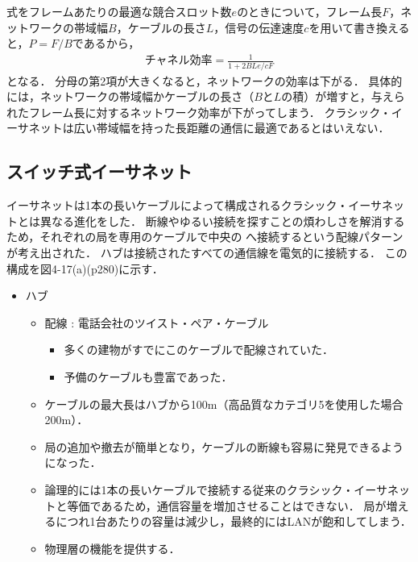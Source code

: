 \documentclass[a4paper]{ltjsarticle}
\begin{document}
式をフレームあたりの最適な競合スロット数\(e\)のときについて，フレーム長\(F\)，ネットワークの帯域幅\(B\)，ケーブルの長さ\(L\)，信号の伝達速度\(c\)を用いて書き換えると，\(P=F/B\)であるから，
\begin{align}
  \text{チャネル効率} = \frac{1}{1+2BLe/cF}
\end{align}
となる． 分母の第2項が大きくなると，ネットワークの効率は下がる．
具体的には，ネットワークの帯域幅かケーブルの長さ（\(B\)と\(L\)の積）が増すと，与えられたフレーム長に対するネットワーク効率が下がってしまう．
クラシック・イーサネットは広い帯域幅を持った長距離の通信に最適であるとはいえない．

\subsection{スイッチ式イーサネット}\label{ux30b9ux30a4ux30c3ux30c1ux5f0fux30a4ux30fcux30b5ux30cdux30c3ux30c8}

イーサネットは1本の長いケーブルによって構成されるクラシック・イーサネットとは異なる進化をした．
断線やゆるい接続を探すことの煩わしさを解消するため，それぞれの局を専用のケーブルで中央の
 へ接続するという配線パターンが考え出された．
ハブは接続されたすべての通信線を電気的に接続する．
この構成を図4-17(a)(p280)に示す．

\begin{itemize}
\item
  ハブ

  \begin{itemize}

  \item
    配線 : 電話会社のツイスト・ペア・ケーブル

    \begin{itemize}
  
    \item
      多くの建物がすでにこのケーブルで配線されていた．
    \item
      予備のケーブルも豊富であった．
    \end{itemize}
  \item
    ケーブルの最大長はハブから100m（高品質なカテゴリ5を使用した場合200m）．
  \item
    局の追加や撤去が簡単となり，ケーブルの断線も容易に発見できるようになった．
  \item
    論理的には1本の長いケーブルで接続する従来のクラシック・イーサネットと等価であるため，通信容量を増加させることはできない．
    局が増えるにつれ1台あたりの容量は減少し，最終的にはLANが飽和してしまう．
  \item
    物理層の機能を提供する．
  \end{itemize}
\end{itemize}
\end{document}

